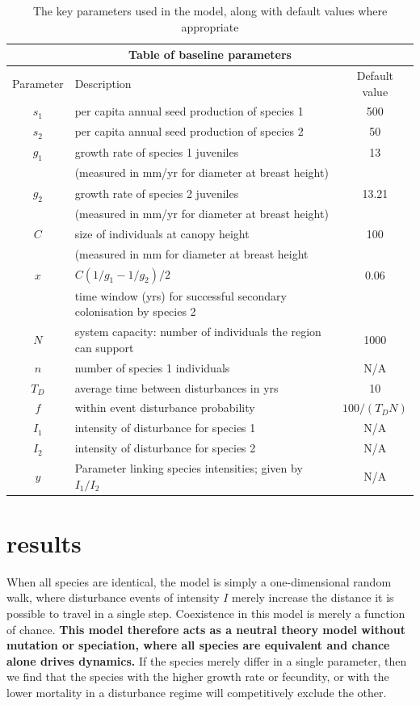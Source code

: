 \documentclass[preprint,10pt,reqno]{report}
\begin{document}
\begin{table}[htdp]
\begin{center}
\begin{tabular}{|c|l|c|} \hline
\multicolumn{3}{|c|}{Table of baseline parameters} \\ \hline
Parameter & Description & Default value \\ \hline
$s_1$ & per capita annual seed production of species 1 & 500 \\ \hline
$s_2$ & per capita annual seed production of species 2 & 50\\ \hline
$g_1$&growth rate of species 1 juveniles & 13 \\
&(measured in mm/yr for diameter at breast height) &\\ \hline
$g_2$&growth rate of species 2 juveniles & 13.21 \\
&(measured in mm/yr for diameter at breast height) &\\ \hline
$C$& size of individuals at canopy height & 100 \\
& (measured in mm for diameter at breast height&\\ \hline
$x$&$C(1/g_1-1/g_2)/2$&0.06\\
&time window (yrs) for successful secondary colonisation by species 2&\\ \hline
$N$ & system capacity: number of individuals the region can support & 1000 \\ \hline
$n$ & number of species 1 individuals & N/A \\ \hline
$T_D$& average time between disturbances in yrs & 10 \\ \hline
$f$& within event disturbance probability & $100/(T_D N)$ \\ \hline
$I_1$& intensity of disturbance for species 1 & N/A \\ \hline
$I_2$& intensity of disturbance for species 2 & N/A \\ \hline
$y$ &Parameter linking species intensities; given by $I_1/I_2$ & N/A \\ \hline
\end{tabular} \end{center}
\caption{The key parameters used in the model, along with default values where appropriate}
\label{tabparas} 
\end{table}

\section{results}
When all species are identical, the model is simply a one-dimensional random walk, where disturbance events of intensity $I$ merely increase the distance it is possible to travel in a single step. Coexistence in this model is merely a function of chance. \textbf{This model therefore acts as a neutral theory model without mutation or speciation, where all species are equivalent and chance alone drives dynamics.} If the species merely differ in a single parameter, then we find that the species with the higher growth rate or fecundity, or with the lower mortality in a disturbance regime will competitively exclude the other.
\end{document}

